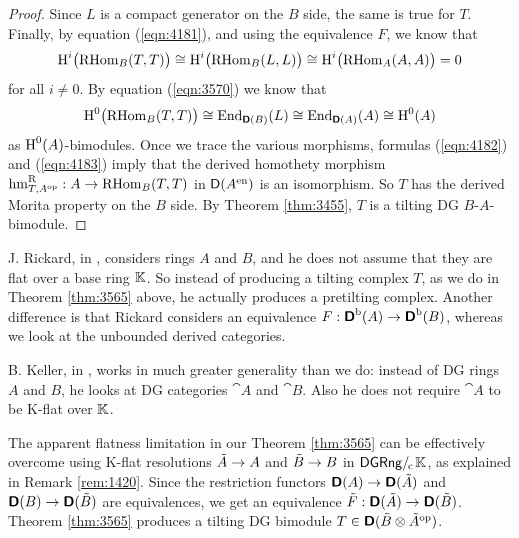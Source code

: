 \begin{proof}
Since $L$ is a compact generator on the $B$ side, the same is true for $T$.
Finally, by equation (\ref{eqn:4181}), and using the equivalence $F$,  
we know that 
\begin{equation} \label{eqn:4182}
\operatorname{H}^i \bigl( \operatorname{RHom}_B(T, T) \bigr) \cong 
\operatorname{H}^i \bigl( \operatorname{RHom}_B(L, L) \bigr) \cong
\operatorname{H}^i \bigl( \operatorname{RHom}_A(A, A) \bigr) = 0
\end{equation}
for all $i \neq 0$. By equation (\ref{eqn:3570}) we know that 
\begin{equation} \label{eqn:4183}
\operatorname{H}^0 \bigl( \operatorname{RHom}_B(T, T) \bigr) \cong 
\operatorname{End}_{\boldsymbol{\mathsf{D}}(B)}(L) \cong \operatorname{End}_{\boldsymbol{\mathsf{D}}(A)}(A) \cong 
\operatorname{H}^0(A) 
\end{equation}
as $\operatorname{H}^0(A)$-bimodules. 
Once we trace the various morphisms, formulas (\ref{eqn:4182}) and 
(\ref{eqn:4183}) imply that the derived homothety morphism 
$\opn{hm}^{\mrm{R}}_{T, A^{\mrm{op}}} : A \to \lb \opn{RHom}_B(T, T)$
in $\operatorname{\mathsf{D}}(A^{\mathrm{en}})$ is an isomorphism. So $T$ has the derived Morita 
property on the $B$ side. 
By Theorem \ref{thm:3455}, $T$ is a tilting DG $B$-$A$-bimodule.
\end{proof}

\begin{rem} \label{rem:4189}
J. Rickard, in \cite[Theorem 6.4]{Ric1}, considers rings $A$ and $B$, and he 
does not assume that they are flat over a base ring $\mathbb{K}$. So instead of 
producing a tilting complex $T$, as we do in Theorem \ref{thm:3565} above, he 
actually produces a pretilting complex. Another difference is that Rickard 
considers an equivalence 
$F : \boldsymbol{\mathsf{D}}^{\mathrm{b}}(A) \to \boldsymbol{\mathsf{D}}^{\mathrm{b}}(B)$,
whereas we look at the unbounded derived categories. 

B. Keller, in \cite[Corollary 9.2]{Kel1}, works in much greater generality than 
we do: instead of DG rings $A$ and $B$, he looks at DG categories $\cat{A}$ and 
$\cat{B}$. Also he does not require $\cat{A}$ to be K-flat over $\mathbb{K}$. 

The apparent flatness limitation in our Theorem \ref{thm:3565} can be 
effectively overcome using K-flat resolutions 
$\tilde{A} \to A$ and $\tilde{B} \to B$ in $\mathrm{\mathsf{DGRng}} /_{\mspace{-2mu} \mathrm{c}} \mspace{2mu} \mathbb{K}$,
as explained in Remark \ref{rem:1420}. Since the restriction functors 
$\boldsymbol{\mathsf{D}}(A) \to \boldsymbol{\mathsf{D}}(\tilde{A})$ and 
$\boldsymbol{\mathsf{D}}(B) \to \boldsymbol{\mathsf{D}}(\tilde{B})$ are equivalences,
we get an equivalence 
$\tilde{F} : \boldsymbol{\mathsf{D}}(\tilde{A}) \to \boldsymbol{\mathsf{D}}(\tilde{B})$.
Theorem \ref{thm:3565} produces a tilting DG bimodule 
$T \in \boldsymbol{\mathsf{D}}(\tilde{B} \otimes \tilde{A}^{\mathrm{op}})$. 
\end{rem}

